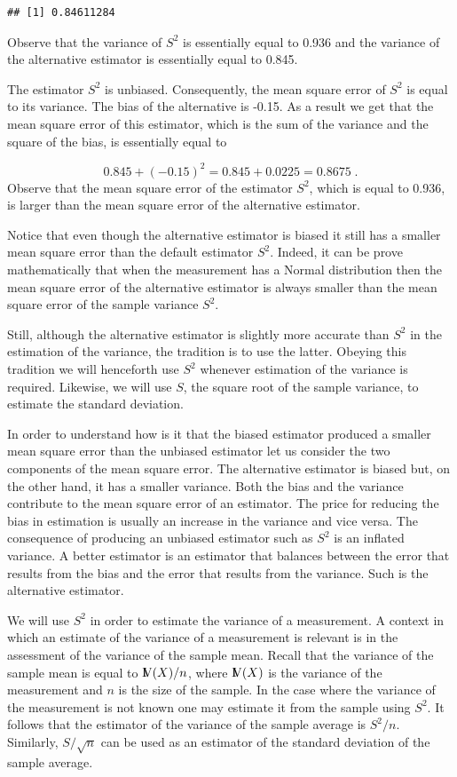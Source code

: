\documentclass[]{krantz}
\newcommand{\Var}{{\rm I\kern-.3em V}}
\theoremstyle{definition}
\theoremstyle{definition}
\theoremstyle{definition}
\theoremstyle{remark}
\begin{document}
\begin{verbatim}
## [1] 0.84611284
\end{verbatim}

Observe that the variance of \(S^2\) is essentially equal to 0.936 and
the variance of the alternative estimator is essentially equal to 0.845.

The estimator \(S^2\) is unbiased. Consequently, the mean square error
of \(S^2\) is equal to its variance. The bias of the alternative is
-0.15. As a result we get that the mean square error of this estimator,
which is the sum of the variance and the square of the bias, is
essentially equal to

\[0.845 + (-0.15)^2 = 0.845 + 0.0225 = 0.8675\;.\] Observe that the mean
square error of the estimator \(S^2\), which is equal to 0.936, is
larger than the mean square error of the alternative estimator.

Notice that even though the alternative estimator is biased it still has
a smaller mean square error than the default estimator \(S^2\). Indeed,
it can be prove mathematically that when the measurement has a Normal
distribution then the mean square error of the alternative estimator is
always smaller than the mean square error of the sample variance
\(S^2\).

Still, although the alternative estimator is slightly more accurate than
\(S^2\) in the estimation of the variance, the tradition is to use the
latter. Obeying this tradition we will henceforth use \(S^2\) whenever
estimation of the variance is required. Likewise, we will use \(S\), the
square root of the sample variance, to estimate the standard deviation.

In order to understand how is it that the biased estimator produced a
smaller mean square error than the unbiased estimator let us consider
the two components of the mean square error. The alternative estimator
is biased but, on the other hand, it has a smaller variance. Both the
bias and the variance contribute to the mean square error of an
estimator. The price for reducing the bias in estimation is usually an
increase in the variance and vice versa. The consequence of producing an
unbiased estimator such as \(S^2\) is an inflated variance. A better
estimator is an estimator that balances between the error that results
from the bias and the error that results from the variance. Such is the
alternative estimator.

We will use \(S^2\) in order to estimate the variance of a measurement.
A context in which an estimate of the variance of a measurement is
relevant is in the assessment of the variance of the sample mean. Recall
that the variance of the sample mean is equal to \(\Var(X)/n\), where
\(\Var(X)\) is the variance of the measurement and \(n\) is the size of
the sample. In the case where the variance of the measurement is not
known one may estimate it from the sample using \(S^2\). It follows that
the estimator of the variance of the sample average is \(S^2/n\).
Similarly, \(S/\sqrt{n}\) can be used as an estimator of the standard
deviation of the sample average.
\end{document}
